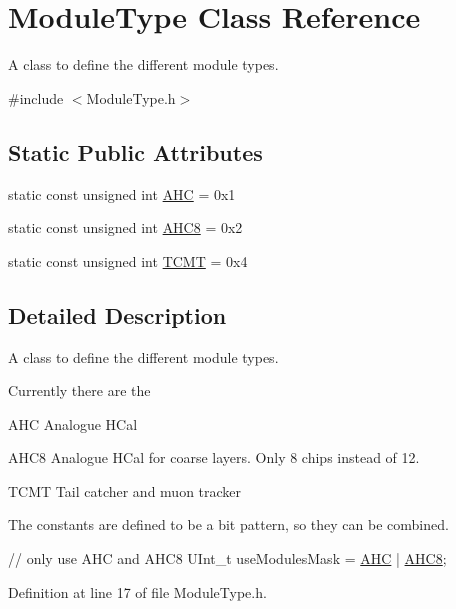 \hypertarget{class_module_type}{\section{Module\-Type Class Reference}
\label{class_module_type}
}


A class to define the different module types.  




{\ttfamily \#include $<$Module\-Type.\-h$>$}

\subsection*{Static Public Attributes}
\begin{DoxyCompactItemize}
\item 
static const unsigned int \hyperlink{class_module_type_aab41c936717bfb248a8bf1f38138db0b}{A\-H\-C} = 0x1
\item 
static const unsigned int \hyperlink{class_module_type_a9cbd6a48fabe66ed9d47d23e53d8c9b9}{A\-H\-C8} = 0x2
\item 
static const unsigned int \hyperlink{class_module_type_a64c7a7092ce31ace2f6e1a44918cd7cc}{T\-C\-M\-T} = 0x4
\end{DoxyCompactItemize}


\subsection{Detailed Description}
A class to define the different module types. 

Currently there are the \begin{DoxyItemize}
\item A\-H\-C Analogue H\-Cal \item A\-H\-C8 Analogue H\-Cal for coarse layers. Only 8 chips instead of 12. \item T\-C\-M\-T Tail catcher and muon tracker\end{DoxyItemize}
The constants are defined to be a bit pattern, so they can be combined. 
\begin{DoxyCode}
\textcolor{comment}{// only use AHC and AHC8}
UInt\_t useModulesMask = \hyperlink{class_module_type_aab41c936717bfb248a8bf1f38138db0b}{AHC} | \hyperlink{class_module_type_a9cbd6a48fabe66ed9d47d23e53d8c9b9}{AHC8};
\end{DoxyCode}
 

Definition at line 17 of file Module\-Type.\-h.




